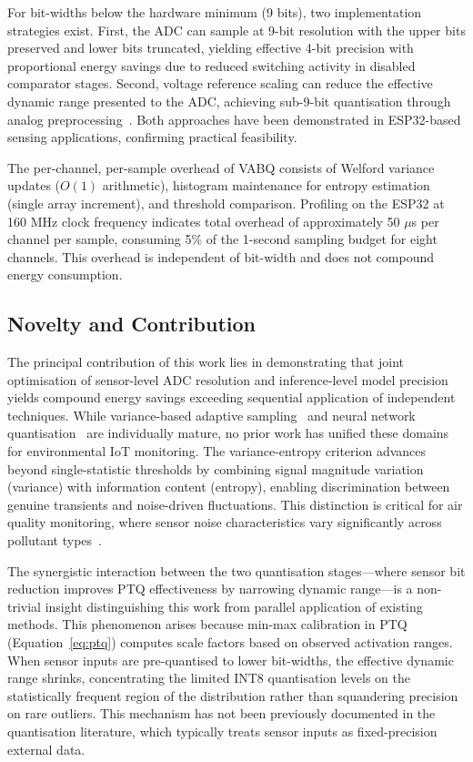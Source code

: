 For bit-widths below the hardware minimum (9 bits), two implementation strategies exist. First, the ADC can sample at 9-bit resolution with the upper bits preserved and lower bits truncated, yielding effective 4-bit precision with proportional energy savings due to reduced switching activity in disabled comparator stages. Second, voltage reference scaling can reduce the effective dynamic range presented to the ADC, achieving sub-9-bit quantisation through analog preprocessing~\cite{murphy2024wiresens}. Both approaches have been demonstrated in ESP32-based sensing applications, confirming practical feasibility.

The per-channel, per-sample overhead of VABQ consists of Welford variance updates ($O(1)$ arithmetic), histogram maintenance for entropy estimation (single array increment), and threshold comparison. Profiling on the ESP32 at 160 MHz clock frequency indicates total overhead of approximately 50 $\mu$s per channel per sample, consuming 5\% of the 1-second sampling budget for eight channels. This overhead is independent of bit-width and does not compound energy consumption.

\subsection{Novelty and Contribution}
\label{sec:disc_novelty}

The principal contribution of this work lies in demonstrating that joint optimisation of sensor-level ADC resolution and inference-level model precision yields compound energy savings exceeding sequential application of independent techniques. While variance-based adaptive sampling~\cite{atitallah2023autonomous} and neural network quantisation~\cite{smoothquant2024,enhancingcnn2024} are individually mature, no prior work has unified these domains for environmental IoT monitoring. The variance-entropy criterion advances beyond single-statistic thresholds by combining signal magnitude variation (variance) with information content (entropy), enabling discrimination between genuine transients and noise-driven fluctuations. This distinction is critical for air quality monitoring, where sensor noise characteristics vary significantly across pollutant types~\cite{karmakar2024exploring}.

The synergistic interaction between the two quantisation stages---where sensor bit reduction improves PTQ effectiveness by narrowing dynamic range---is a non-trivial insight distinguishing this work from parallel application of existing methods. This phenomenon arises because min-max calibration in PTQ (Equation~\ref{eq:ptq}) computes scale factors based on observed activation ranges. When sensor inputs are pre-quantised to lower bit-widths, the effective dynamic range shrinks, concentrating the limited INT8 quantisation levels on the statistically frequent region of the distribution rather than squandering precision on rare outliers. This mechanism has not been previously documented in the quantisation literature, which typically treats sensor inputs as fixed-precision external data.

